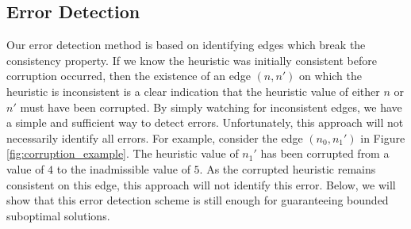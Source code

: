 \documentclass{article}
\begin{document}

\subsection{Error Detection}

Our error detection method 
is based on identifying edges which break the consistency property.
If we know the heuristic was initially consistent before corruption occurred, then the existence of an edge $(n, n')$ on which the heuristic is inconsistent is a clear indication that the heuristic value of either $n$ or $n'$ must have been corrupted.
By simply watching for inconsistent edges, we have a simple and sufficient way to detect errors.
Unfortunately, this approach will not necessarily identify all errors.
For example, consider the edge $(n_0, n_1')$ in Figure \ref{fig:corruption_example}.
The heuristic value of $n_1'$ has been corrupted from a value of $4$ to the inadmissible value of $5$.
As the corrupted heuristic remains consistent on this edge, this approach will not identify this error.
Below, we will show that this error detection scheme is still enough for guaranteeing bounded suboptimal solutions. 






\end{document}
